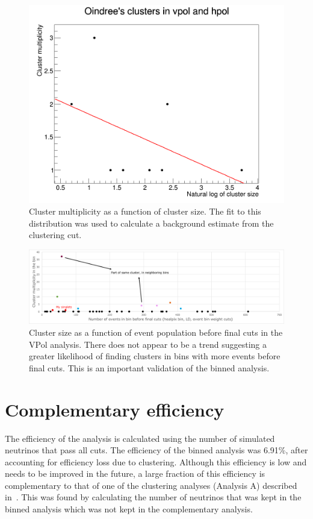 \begin{figure}
\centering
\includegraphics[width=1.0\textwidth]{figures/clusterSizeVsMultiplicity.png}
\caption{Cluster multiplicity as a function of cluster size. The fit to this distribution was used to calculate a background estimate from the clustering cut.}
\label{cluster_mul}
\end{figure}


\begin{figure}
\centering
\includegraphics[width=1.0\textwidth]{figures/clusterMultiplicityVsEventPopulationBeforeFinalCuts.png}
\caption{Cluster size as a function of event population before final cuts in the VPol analysis. There does not appear to be a trend suggesting a greater likelihood of finding clusters in bins with more events before final cuts. This is an important validation of the binned analysis.}
\label{cluster_pop}
\end{figure}

\section{Complementary efficiency}

The efficiency of the analysis is calculated using the number of simulated neutrinos that pass all cuts. The efficiency of the binned analysis was 6.91\%, after accounting for efficiency loss due to clustering. Although this efficiency is low and needs to be improved in the future, a large fraction of this efficiency is complementary to that of one of the clustering analyses (Analysis A) described in~\cite{diffuse}. This was found by calculating the number of neutrinos that was kept in the binned analysis which was not kept in the complementary analysis. 

